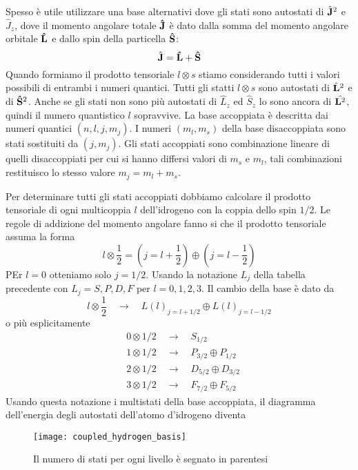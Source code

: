 Spesso \`e utile utilizzare una base alternativi dove gli stati sono autostati di $\hat{\bold{J}}^2$ e $\hat{J}_{z}$, dove il momento angolare totale $\bold{\hat{J}}$ \`e dato dalla somma del momento angolare orbitale $\bold{\hat{L}}$ e dallo spin della particella $\bold{\hat{S}}$:
\begin{equation*}
	\hat{\bold{J}} = \bold{\hat{L}} + \bold{\hat{S}}
\end{equation*}
Quando formiamo il prodotto tensoriale $l \otimes s$ stiamo considerando tutti i valori possibili di entrambi i numeri quantici. Tutti gli statti $l \otimes s$ sono autostati di $\hat{\bold{L}}^2$ e di $\bold{\hat{S}}^2$. Anche se gli stati non sono pi\`u autostati di $\hat{L}_{z}$ ed $\hat{S}_{z}$ lo sono ancora di $\hat{\bold{L}^2}$, quindi il numero quantistico $l$ sopravvive. La base accoppiata \`e descritta dai numeri quantici $(n,l,j,m_j)$.  I numeri $(m_l,m_s)$ della base disaccoppiata sono stati sostituiti da $(j,m_j)$. Gli stati accoppiati sono combinazione lineare di quelli disaccoppiati per cui si hanno differsi valori di $m_s$ e $m_l$, tali combinazioni restituisco lo stesso valore $m_j = m_l + m_s$.

Per determinare tutti gli stati accoppiati dobbiamo calcolare il prodotto tensoriale di ogni multicoppia $l$ dell'idrogeno con la coppia dello spin $1/2$. Le regole di addizione del momento angolare fanno si che il prodotto tensoriale assuma la forma
\begin{equation*}
	l \otimes \frac{1}{2} = \left (j=l + \frac{1}{2} \right ) \oplus \left (j = l-\frac{1}{2} \right )
\end{equation*}
PEr $l = 0$ otteniamo solo $j = 1/2$. Usando la notazione $L_j$ della tabella precedente con $L_j = S,P,D,F$ per $l = 0,1,2,3$. Il cambio della base \`e dato da 
\begin{equation*}
	l \otimes \frac{1}{2} \quad \rightarrow \quad L(l)_{j=l+ 1/2} \oplus L(l)_{j=l- 1/2}
\end{equation*}
o pi\`u esplicitamente
\begin{align*}
	& 0 \otimes 1/2 \quad \rightarrow \quad S_{1/2} \\[0.5cm]
	& 1 \otimes 1/2 \quad \rightarrow \quad P_{3/2} \oplus P_{1/2}\\[0.5cm]
	& 2 \otimes 1/2 \quad \rightarrow \quad D_{5/2} \oplus D_{3/2} \\[0.5cm]
	& 3 \otimes 1/2 \quad \rightarrow \quad F_{7/2} \oplus F_{5/2} 
\end{align*}
Usando questa notazione i multistati della base accoppiata, il diagramma dell'energia degli autostati dell'atomo d'idrogeno diventa 
\begin{figure}[!ht]
\vspace{0.1in}
\texttt{[image: coupled\_hydrogen\_basis]}	
\centering
\caption{Il numero di stati per ogni livello \`e segnato in parentesi}
\vspace{0.1in}
\end{figure}
